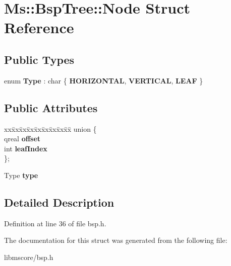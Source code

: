 \hypertarget{struct_ms_1_1_bsp_tree_1_1_node}{}\section{Ms\+:\+:Bsp\+Tree\+:\+:Node Struct Reference}
\label{struct_ms_1_1_bsp_tree_1_1_node}
\subsection*{Public Types}
\begin{DoxyCompactItemize}
\item 
\mbox{\label{struct_ms_1_1_bsp_tree_1_1_node_afecfd8c1c0eea357498d3f7479b2e542}} 
enum {\bfseries Type} \+: char \{ {\bfseries H\+O\+R\+I\+Z\+O\+N\+T\+AL}, 
{\bfseries V\+E\+R\+T\+I\+C\+AL}, 
{\bfseries L\+E\+AF}
 \}
\end{DoxyCompactItemize}
\subsection*{Public Attributes}
\begin{DoxyCompactItemize}
\item 
\mbox{\label{struct_ms_1_1_bsp_tree_1_1_node_abb50d2cddbdc00f94f3ee5a2db371edf}} 
\begin{tabbing}
xx\=xx\=xx\=xx\=xx\=xx\=xx\=xx\=xx\=\kill
union \{\\
\>qreal {\bfseries offset}\\
\>int {\bfseries leafIndex}\\
\}; \\

\end{tabbing}\item 
\mbox{\label{struct_ms_1_1_bsp_tree_1_1_node_a777959f12007b4c1e4f3eb366785912b}} 
Type {\bfseries type}
\end{DoxyCompactItemize}


\subsection{Detailed Description}


Definition at line 36 of file bsp.\+h.



The documentation for this struct was generated from the following file\+:\begin{DoxyCompactItemize}
\item 
libmscore/bsp.\+h\end{DoxyCompactItemize}
